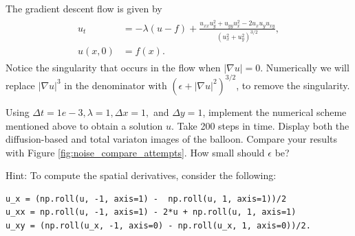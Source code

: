 The gradient descent flow is given by
\begin{align}
    \begin{split}
u_t &= -\lambda (u-f) + \frac{u_{xx}u_y^2 + u_{yy}u_x^2 - 2u_xu_yu_{xy}}{(u_x^2 + u_y^2)^{3/2}} ,\\
u(x,0) &= f(x).
\end{split} \label{tv_images:tv_flow}
\end{align}
Notice the singularity that occurs in the flow when $|\nabla u| = 0$. Numerically we will replace  $|\nabla u|^{3}$ in the denominator with $(\epsilon + |\nabla u|^{2})^{3/2}$, to remove the singularity.


\begin{problem}
Using $\Delta t = 1e-3, \lambda = 1, \Delta x = 1,$ and $ \Delta y = 1$, implement the numerical scheme mentioned above to obtain a solution $u$.  Take 200 steps in time. Display both the diffusion-based and total variaton images of the balloon. Compare your results with Figure \ref{fig:noise_compare_attempts}. How small should $\epsilon$ be?

Hint: To compute the spatial derivatives, consider the following:
\begin{lstlisting}
u_x = (np.roll(u, -1, axis=1) -  np.roll(u, 1, axis=1))/2
u_xx = np.roll(u, -1, axis=1) - 2*u + np.roll(u, 1, axis=1)
u_xy = (np.roll(u_x, -1, axis=0) - np.roll(u_x, 1, axis=0))/2.
\end{lstlisting}
\end{problem}

